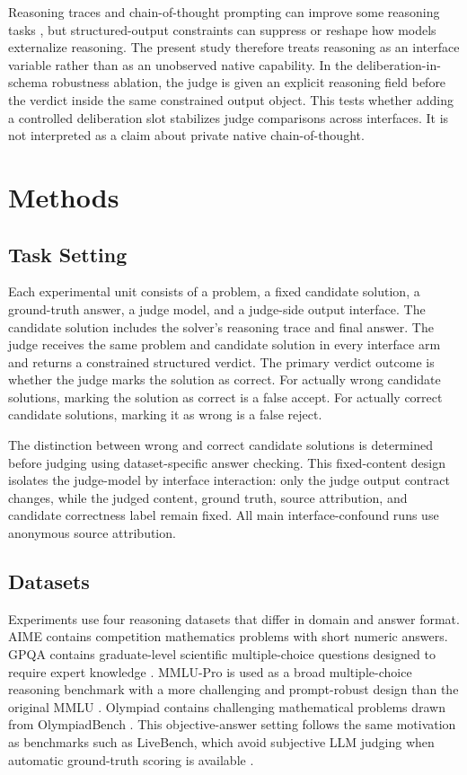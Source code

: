 \documentclass[journal]{IEEEtran}
\begin{document}
Reasoning traces and chain-of-thought prompting can improve some reasoning tasks \citep{wei2022cot}, but structured-output constraints can suppress or reshape how models externalize reasoning. The present study therefore treats reasoning as an interface variable rather than as an unobserved native capability. In the deliberation-in-schema robustness ablation, the judge is given an explicit reasoning field before the verdict inside the same constrained output object. This tests whether adding a controlled deliberation slot stabilizes judge comparisons across interfaces. It is not interpreted as a claim about private native chain-of-thought.

\section{Methods}
\label{sec:methods}

\subsection{Task Setting}
\label{sec:task-setting}

Each experimental unit consists of a problem, a fixed candidate solution, a ground-truth answer, a judge model, and a judge-side output interface. The candidate solution includes the solver's reasoning trace and final answer. The judge receives the same problem and candidate solution in every interface arm and returns a constrained structured verdict. The primary verdict outcome is whether the judge marks the solution as correct. For actually wrong candidate solutions, marking the solution as correct is a false accept. For actually correct candidate solutions, marking it as wrong is a false reject.

The distinction between wrong and correct candidate solutions is determined before judging using dataset-specific answer checking. This fixed-content design isolates the judge-model by interface interaction: only the judge output contract changes, while the judged content, ground truth, source attribution, and candidate correctness label remain fixed. All main interface-confound runs use anonymous source attribution.

\subsection{Datasets}
\label{sec:datasets}

Experiments use four reasoning datasets that differ in domain and answer format. AIME contains competition mathematics problems with short numeric answers. GPQA contains graduate-level scientific multiple-choice questions designed to require expert knowledge \citep{rein2023gpqa}. MMLU-Pro is used as a broad multiple-choice reasoning benchmark with a more challenging and prompt-robust design than the original MMLU \citep{wang2024mmlupro}. Olympiad contains challenging mathematical problems drawn from OlympiadBench \citep{he2024olympiadbench}. This objective-answer setting follows the same motivation as benchmarks such as LiveBench, which avoid subjective LLM judging when automatic ground-truth scoring is available \citep{white2024livebench}.
\end{document}
